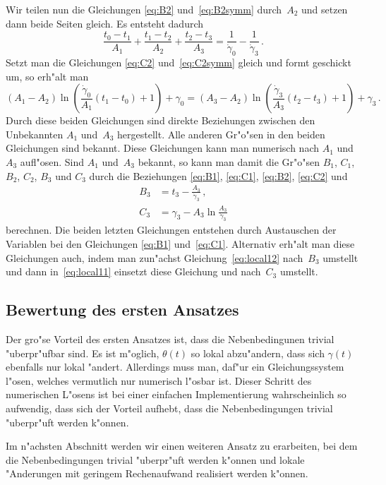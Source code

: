 \documentclass[a4paper]{scrartcl}
\begin{document}
Wir teilen nun die Gleichungen \eqref{eq:B2} und~\eqref{eq:B2symm} durch~$A_2$ und setzen dann beide Seiten gleich. 
Es entsteht dadurch
$$ \frac{t_0-t_1}{A_1}+\frac{t_1-t_2}{A_2}+\frac{t_2-t_3}{A_3} 
  = \frac{1}{\dot\gamma_0}-\frac{1}{\dot\gamma_3}\,. $$
Setzt man die Gleichungen \eqref{eq:C2} und~\eqref{eq:C2symm} gleich und formt geschickt um, so erh"alt man
$$ (A_1-A_2)\ln\left(\frac{\dot\gamma_0}{A_1}(t_1-t_0)+1\right)+\gamma_0
  = (A_3-A_2)\ln\left(\frac{\dot\gamma_3}{A_3}(t_2-t_3)+1\right)+\gamma_3\,. $$
Durch diese beiden Gleichungen sind direkte Beziehungen zwischen den Unbekannten $A_1$ und~$A_3$ hergestellt. 
Alle anderen Gr"o"sen in den beiden Gleichungen sind bekannt. 
Diese Gleichungen kann man numerisch nach $A_1$ und~$A_3$ aufl"osen. 
Sind $A_1$ und~$A_3$ bekannt, so kann man damit die Gr"o"sen $B_1$, $C_1$, $B_2$, $C_2$, $B_3$ und $C_3$ durch die Beziehungen \eqref{eq:B1}, \eqref{eq:C1}, \eqref{eq:B2}, \eqref{eq:C2} und 
\begin{align*}
  B_3 &= t_3-\frac{A_3}{\dot\gamma_3}\,, \\
  C_3 &= \gamma_3-A_3\ln\frac{A_3}{\dot\gamma_3}
\end{align*}
berechnen. Die beiden letzten Gleichungen entstehen durch Austauschen der Variablen bei den Gleichungen \eqref{eq:B1} und~\eqref{eq:C1}. 
Alternativ erh"alt man diese Gleichungen auch, indem man zun"achst Gleichung~\eqref{eq:local12} nach~$B_3$ umstellt und dann in~\eqref{eq:local11} einsetzt diese Gleichung und nach~$C_3$ umstellt. 


\subsection{Bewertung des ersten Ansatzes}

Der gro"se Vorteil des ersten Ansatzes ist, dass die Nebenbedingunen trivial "uberpr"ufbar sind. 
Es ist m"oglich, $\theta(t)$ so lokal abzu"andern, dass sich $\gamma(t)$ ebenfalls nur lokal "andert. 
Allerdings muss man, daf"ur ein Gleichungssystem l"osen, welches vermutlich nur numerisch l"osbar ist. 
Dieser Schritt des numerischen L"osens ist bei einer einfachen Implementierung wahrscheinlich so aufwendig, dass sich der Vorteil aufhebt, dass die Nebenbedingungen trivial "uberpr"uft werden k"onnen. 

Im n"achsten Abschnitt werden wir einen weiteren Ansatz zu erarbeiten, bei dem die Nebenbedingungen trivial "uberpr"uft werden k"onnen und lokale "Anderungen mit geringem Rechenaufwand realisiert werden k"onnen.
\end{document}
